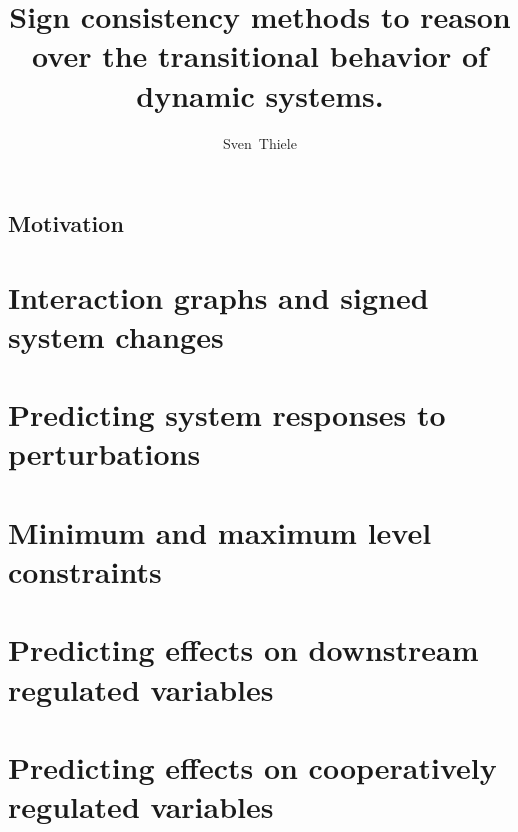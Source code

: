 \documentclass{llncs}
\begin{document}
\pagestyle{plain}

\title{Sign consistency methods to reason over the transitional behavior of dynamic systems.}
\author{
  Sven~Thiele
}
\maketitle

\section*{Motivation}


\tableofcontents

\nocite{sk06}
\nocite{saez2009}
\nocite{sthiele10b}
\nocite{sthiele11a}
\nocite{samaga13a}
\nocite{samaga13b}
\nocite{sthiele15}



 


\chapter*{Interaction graphs and signed system changes}

% 
%  

\chapter*{Predicting system responses to perturbations}


\chapter*{Minimum and maximum level constraints}


\chapter*{Predicting effects on downstream regulated variables}


\chapter*{Predicting effects on cooperatively regulated variables}

\end{document}
